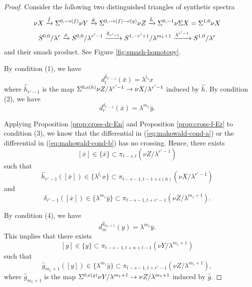 \begin{proof}
    Consider the following two distinguished triangles of synthetic spectra
    \begin{gather*}
        \nu X\xrightarrow{\hat f} \Sigma^{0,-e(f)}\nu Y\xrightarrow{\hat g} \Sigma^{0,-e(f)-e(g)}\nu Z\xrightarrow{\hat h} \Sigma^{0,-1}\nu \Sigma X=\Sigma^{1,0}\nu X\\
        S^{0,0}/\lambda^{r}\xrightarrow{\rho} S^{0,0}/\lambda^{r'-1} \xrightarrow{\delta_{r'-1}} S^{1,-r'+1}/\lambda^{m_1+1} \xrightarrow{\lambda^{r'-1}} S^{1,0}/\lambda^{r}
    \end{gather*}
    and their smash product. See Figure \ref{fig:smash-homotopy}.

    By condition (1), we have
    \begin{equation}\label{eq:mahowald-cond-a}
        d^{\hat h_{r'-1}}_l(\bar x)=\lambda^{l_1}x
    \end{equation}
    where $\hat h_{r'-1}$ is the map $\Sigma^{0,e(h)}\nu Z/\lambda^{r'-1}\to \nu X/\lambda^{r'-1}$ induced by $\hat h$.
    By condition (2), we have
    \begin{equation}\label{eq:mahowald-cond-b}
        d^{\delta_{r'-1}}_r(\bar x)=\lambda^{m_1}\bar y.
    \end{equation}
 
    
    Applying Proposition \ref{prop:cross-dr-En} and Proposition \ref{prop:cross-f-Er} to condition (3), we know that the differential in (\ref{eq:mahowald-cond-a}) or the differential in (\ref{eq:mahowald-cond-b}) has no crossing. Hence, there exists
    $$[\bar x]\in \{\bar x\}\subset \pi_{t-s,t}(\nu Z/\lambda^{r'-1})$$
    such that
    $$\hat h_{r'-1}([\bar x])\in \{\lambda^{l_1}x\}\subset \pi_{t-s-1, t-1+e(h)}(\nu X/\lambda^{r'-1})$$
    and
    $$\delta_{r'-1}([\bar x])\in \{\lambda^{m_1}\bar y\}\subset \pi_{t-s-1,t+r'-1}(\nu Z/\lambda^{m_1+1}).$$

    By condition (4), we have
    \begin{equation*}
        d^{\hat g_{m_1+1}}_m(y)=\lambda^{m_1}\bar y.
    \end{equation*}
    This implies that there exists
    $$[y]\in \{y\}\subset \pi_{t-s-1,t+n+l-1}(\nu Y/\lambda^{m_1+1})$$
    such that
    $$\hat g_{m_1+1}([y])\in \{\lambda^{m_1}\bar y\}\subset \pi_{t-s-1, t+r'-1}(\nu Z/\lambda^{m_1+1}),$$
    where $\hat g_{m_1+1}$ is the map $\Sigma^{0,e(g)}\nu Y/\lambda^{m_1+1}\to \nu Z/\lambda^{m_1+1}$ induced by $\hat g$.
    

\end{proof}
